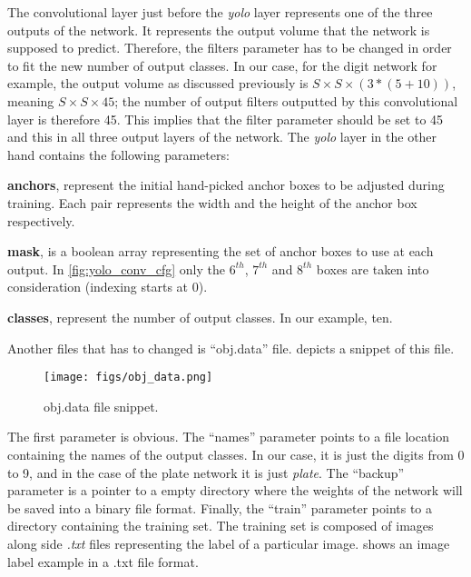 The convolutional layer just before the \emph{yolo} layer represents one of the three outputs of the network. It represents the output volume that the network is supposed to predict. Therefore, the filters parameter has to be changed in order to fit the new number of output classes. In our case, for the digit network for example, the output volume as discussed previously is $S \times S \times (3 * (5 + 10))$, meaning $S \times S \times 45$; the number of output filters outputted by this convolutional layer is therefore 45. This
implies that the filter parameter should be set to 45 and this in all three output layers of the network.
The \emph{yolo} layer in the other hand contains the following parameters:

\begin{compactitem}
	\item \textbf{anchors}, represent the initial hand-picked anchor boxes to be adjusted during training. Each pair represents
	the width and the height of the anchor box respectively.
	\item \textbf{mask}, is a boolean array representing the set of anchor boxes to use at each output. In \cref{fig:yolo_conv_cfg} only the $6^{th}$, $7^{th}$ and $8^{th}$ boxes are taken into consideration (indexing starts at 0).
	\item \textbf{classes}, represent the number of output classes. In our example, ten.
\end{compactitem}

Another files that has to changed is ``obj.data'' file.  depicts a snippet of this file.

\begin{figure}[!htpb]
	\centering
	\texttt{[image: figs/obj\_data.png]}
	\caption{obj.data file snippet.}
	\label{fig:obj.data}
\end{figure}

The first parameter is obvious. The ``names'' parameter points to a file location containing the names of the output classes.
In our case, it is just the digits from 0 to 9, and in the case of the plate network it is just \emph{plate}.
The ``backup'' parameter is a pointer to a empty directory where the weights of the network will be saved
into a binary file format. Finally, the ``train'' parameter points to a directory containing the training set.
The training set is composed of images along side \emph{.txt} files representing the label of a particular image.  shows an image label example in a .txt file format.

